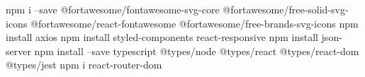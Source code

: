 npm i --save @fortawesome/fontawesome-svg-core 
    @fortawesome/free-solid-svg-icons 
    @fortawesome/react-fontawesome
    @fortawesome/free-brands-svg-icons
npm install axios
npm install styled-components react-responsive
npm install json-server
npm install --save typescript @types/node @types/react @types/react-dom @types/jest
npm i react-router-dom